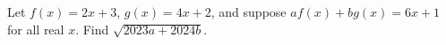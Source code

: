 Let $f(x)=2x+3$, $g(x)=4x+2$, and suppose $af(x)+bg(x)=6x+1$ for all real $x$. Find $\sqrt{2023a+2024b}$.
